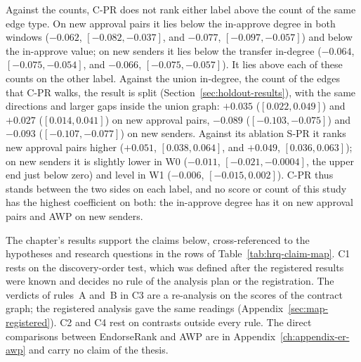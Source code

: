 Against the counts, \mbox{C-PR} does not rank either label above the count of the same edge type. On new approval pairs it lies below the in-approve degree in both windows ($-0.062$, $[-0.082,-0.037]$, and $-0.077$, $[-0.097,-0.057]$) and below the in-approve value; on new senders it lies below the transfer in-degree ($-0.064$, $[-0.075,-0.054]$, and $-0.066$, $[-0.075,-0.057]$). It lies above each of these counts on the other label. Against the union in-degree, the count of the edges that \mbox{C-PR} walks, the result is split (Section~\ref{sec:holdout-results}), with the same directions and larger gaps inside the union graph: $+0.035$ ($[0.022,0.049]$) and $+0.027$ ($[0.014,0.041]$) on new approval pairs, $-0.089$ ($[-0.103,-0.075]$) and $-0.093$ ($[-0.107,-0.077]$) on new senders. Against its ablation \mbox{S-PR} it ranks new approval pairs higher ($+0.051$, $[0.038,0.064]$, and $+0.049$, $[0.036,0.063]$); on new senders it is slightly lower in W0 ($-0.011$, $[-0.021,-0.0004]$, the upper end just below zero) and level in W1 ($-0.006$, $[-0.015,0.002]$). \mbox{C-PR} thus stands between the two sides on each label, and no score or count of this study has the highest coefficient on both: the in-approve degree has it on new approval pairs and AWP on new senders.


The chapter's results support the claims below, cross-referenced to the hypotheses and research questions in the rows of Table~\ref{tab:hrq-claim-map}. C1 rests on the discovery-order test, which was defined after the registered results were known and decides no rule of the analysis plan or the registration. The verdicts of rules~A and~B in C3 are a re-analysis on the scores of the contract graph; the registered analysis gave the same readings (Appendix~\ref{sec:map-registered}). C2 and C4 rest on contrasts outside every rule. The direct comparisons between EndorseRank and AWP are in Appendix~\ref{ch:appendix-er-awp} and carry no claim of the thesis.

